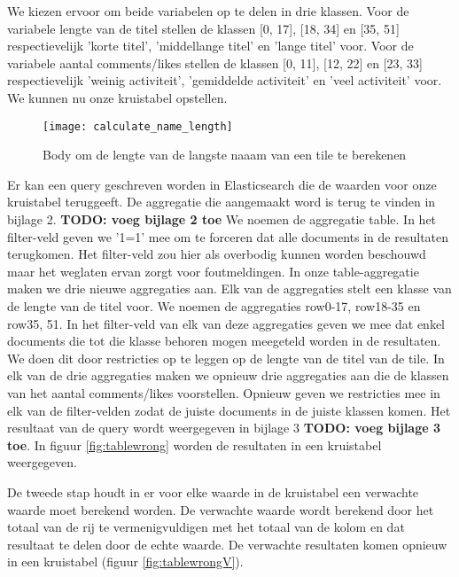 We kiezen ervoor om beide variabelen op te delen in drie klassen. Voor de variabele lengte van de titel stellen de klassen [0, 17], [18, 34] en [35, 51] respectievelijk 'korte titel', 'middellange titel' en 'lange titel' voor. Voor de variabele aantal comments/likes stellen de klassen [0, 11], [12, 22] en [23, 33] respectievelijk 'weinig activiteit', 'gemiddelde activiteit' en 'veel activiteit' voor. We kunnen nu onze kruistabel opstellen.

\begin{figure}
	\centering
	\texttt{[image: calculate\_name\_length]}
	\caption{Body om de lengte van de langste naaam van een tile te berekenen}
	\label{fig:calculatenamelength}
\end{figure}

Er kan een query geschreven worden in Elasticsearch die de waarden voor onze kruistabel teruggeeft. De aggregatie die aangemaakt word is terug te vinden in bijlage 2. \textbf{TODO: voeg bijlage 2 toe} We noemen de aggregatie table. In het filter-veld geven we '1=1' mee om te forceren dat alle documents in de resultaten terugkomen. Het filter-veld zou hier als overbodig kunnen worden beschouwd maar het weglaten ervan zorgt voor foutmeldingen. In onze table-aggregatie maken we drie nieuwe aggregaties aan. Elk van de aggregaties stelt een klasse van de lengte van de titel voor. We noemen de aggregaties row0-17, row18-35 en row35, 51. In het filter-veld van elk van deze aggregaties geven we mee dat enkel documents die tot die klasse behoren mogen meegeteld worden in de resultaten. We doen dit door restricties op te leggen op de lengte van de titel van de tile. In elk van de drie aggregaties maken we opnieuw drie aggregaties aan die de klassen van het aantal comments/likes voorstellen. Opnieuw geven we restricties mee in elk van de filter-velden zodat de juiste documents in de juiste klassen komen. Het resultaat van de query wordt weergegeven in bijlage 3 \textbf{TODO: voeg bijlage 3 toe}. In figuur \ref{fig:tablewrong} worden de resultaten in een kruistabel weergegeven.

De tweede stap houdt in er voor elke waarde in de kruistabel een verwachte waarde moet berekend worden. De verwachte waarde wordt berekend door het totaal van de rij te vermenigvuldigen met het totaal van de kolom en dat resultaat te delen door de echte waarde. De verwachte resultaten komen opnieuw in een kruistabel (figuur \ref{fig:tablewrongV}).

